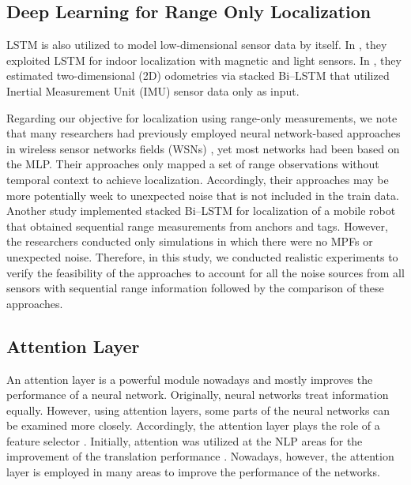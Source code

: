 \documentclass[letterpaper, 10 pt, conference]{ieeeconf}
\begin{document}
 
\subsection{Deep Learning for Range Only Localization}

LSTM is also utilized to model low-dimensional sensor data by itself. In \cite{wang2018deepml}, they exploited LSTM for indoor localization with magnetic and light sensors. In \cite{chen2018ionet}, they estimated two-dimensional (2D) odometries via stacked Bi--LSTM that utilized Inertial Measurement Unit (IMU) sensor data only as input. 

Regarding our objective for localization using range-only measurements, we note that many researchers had previously employed neural network-based approaches in wireless sensor networks fields (WSNs) \cite{rahman2009localization, abdelhadi2013efficient, kumar2016localization}, yet most networks had been based on the MLP. Their approaches only mapped a set of range observations without temporal context to achieve localization. Accordingly, their approaches may be more potentially week to unexpected noise that is not included in the train data. Another study \cite{lim2018effective} implemented stacked Bi--LSTM for localization of a mobile robot that obtained sequential range measurements from anchors and tags. However, the researchers conducted only simulations in which there were no MPFs or unexpected noise. Therefore, in this study, we conducted realistic experiments to verify the feasibility of the approaches to account for all the noise sources from all sensors with sequential range information followed by the comparison of these approaches.

\subsection{Attention Layer}

An attention layer is a powerful module nowadays and mostly improves the performance of a neural network. Originally, neural networks treat information equally. However, using attention layers, some parts of the neural networks can be examined more closely. Accordingly, the attention layer plays the role of a feature selector \cite{wang2017residual}. Initially, attention was utilized at the NLP areas for the improvement of the translation performance \cite{luong2015effective}. Nowadays, however, the attention layer is employed in many areas to improve the performance of the networks. 
\end{document}
